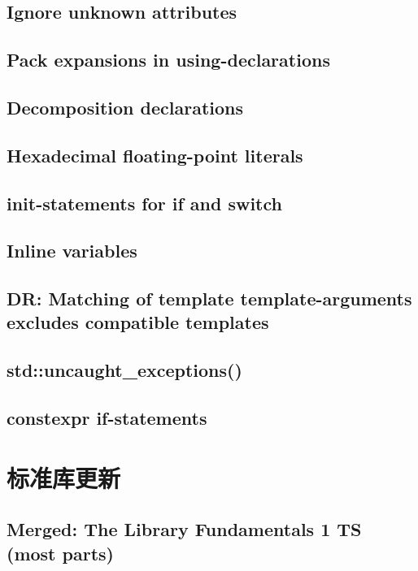 \documentclass{book}
\begin{document}
\subsection{Ignore unknown attributes}

\subsection{Pack expansions in using-declarations}

\subsection{Decomposition declarations}

\subsection{Hexadecimal floating-point literals}

\subsection{init-statements for if and switch}

\subsection{Inline variables}

\subsection{DR: Matching of template template-arguments excludes compatible templates}

\subsection{std::uncaught\_exceptions()}

\subsection{constexpr if-statements}

\section{标准库更新}

\subsection{Merged: The Library Fundamentals 1 TS (most parts)}
\end{document}
